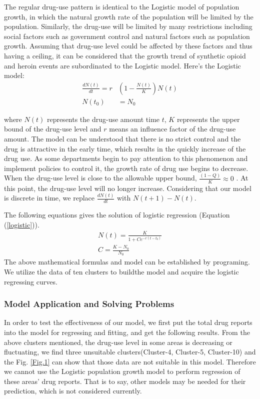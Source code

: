\documentclass[12pt]{article}
\begin{document}
The regular drug-use pattern is identical to the Logistic model of population growth, in which the natural growth rate of the population will be limited by the population. Similarly, the drug-use will be limited by many restrictions including social factors such as government control and natural factors such as population growth. Assuming that drug-use level could be affected by these factors and thus having a ceiling, it can be considered that the growth trend of synthetic opioid and heroin events are subordinated to the Logistic model. Here’s the Logistic model:
\begin{equation}
	\begin{split}
	\frac{dN(t)}{dt} = r&(1-\frac{N(t)}{K})N(t) \label{logistic}\\
	N(t_{0}) &= N_{0}
	\end{split}
\end{equation}

where $N(t)$ represents the drug-use amount time $t$, $K$ represents the upper bound of the drug-use level and $r$ means an influence factor of the drug-use amount. The model can be understood that there is no strict control and the drug is attractive in the early time, which results in the quickly increase of the drug use. As some departments begin to pay attention to this phenomenon and implement policies to control it, the growth rate of drug use begins to decrease. When the drug-use level is close to the allowable upper bound, $\frac{(1-Q)}{K} \approx 0$ . At this point, the drug-use level will no longer increase. Considering that our model is discrete in time,  we replace $\frac{dN(t)}{dt}$ with $N(t+1)-N(t)$.

The following equations gives the solution of logistic regression (Equation (\ref{logistic})).
\begin{gather}
	N(t)=\frac{K}{1+Ce^{-r(t-t_{0})}} \\
	C=\frac{K-N_{0}}{N_{0}} 
\end{gather}
The above mathematical formulas and model can be established by programing. We utilize the data of ten clusters to buildthe model and acquire the logistic regressing curves.

\subsubsection{Model Application and Solving Problems}
In order to test the effectiveness of our model, we first put the total drug reports into the model for regressing and fitting, and get the following results. From the above clusters mentioned, the drug-use level in some areas is decreasing or fluctuating, we find three unsuitable clusters(Cluster-4, Cluster-5, Cluster-10) and the Fig. \ref{Fig.1} can show that those data are not suitable in this model. Therefore we cannot use the Logistic population growth model to perform regression of these areas’ drug reports. That is to say, other models may be needed for their prediction, which is not considered currently.
\end{document}
